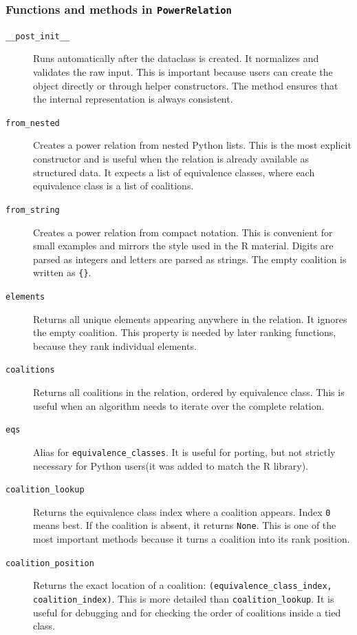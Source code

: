\documentclass[11pt]{article}
\begin{document}
\subsubsection*{Functions and methods in \texttt{PowerRelation}}

\begin{description}
  \item[\texttt{\_\_post\_init\_\_}]
Runs automatically after the dataclass is created. It normalizes and
validates the raw input. This is important because users can create the object
directly or through helper constructors. The method ensures that the internal
representation is always consistent.

  \item[\texttt{from\_nested}]
Creates a power relation from nested Python lists. This is the most explicit
constructor and is useful when the relation is already available as structured
data. It expects a list of equivalence classes, where each equivalence class is
a list of coalitions.

  \item[\texttt{from\_string}]
Creates a power relation from compact notation. This is convenient for small
examples and mirrors the style used in the R material. Digits are parsed as
integers and letters are parsed as strings. The empty coalition is written as
\texttt{\{\}}.

  \item[\texttt{elements}]
Returns all unique elements appearing anywhere in the relation. It ignores
the empty coalition. This property is needed by later ranking functions,
because they rank individual elements.

  \item[\texttt{coalitions}]
Returns all coalitions in the relation, ordered by equivalence class. This is
useful when an algorithm needs to iterate over the complete relation.

  \item[\texttt{eqs}]
Alias for \texttt{equivalence\_classes}. It is useful for porting, but not
strictly necessary for Python users(it was added to match the R library).

  \item[\texttt{coalition\_lookup}]
Returns the equivalence class index where a coalition appears. Index
\texttt{0} means best. If the coalition is absent, it returns \texttt{None}.
This is one of the most important methods because it turns a coalition into
its rank position.

  \item[\texttt{coalition\_position}]
Returns the exact location of a coalition:
\texttt{(equivalence\_class\_index, coalition\_index)}. This is more detailed
than \texttt{coalition\_lookup}. It is useful for debugging and for checking
the order of coalitions inside a tied class.


\end{description}
\end{document}
